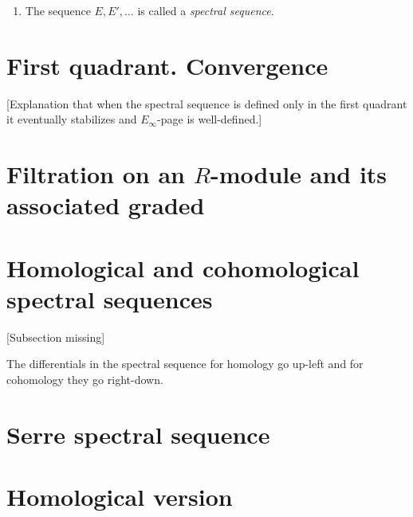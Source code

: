 \begin{enumerate}
	\item The sequence $E,E',\ldots$ is called a
	{\it spectral sequence}.
\end{enumerate}

\section{First quadrant. Convergence}
\label{section-first-quadrant-convergence}

[Explanation that when the spectral sequence
is defined only in the first quadrant it
eventually stabilizes and $E_{\infty}$-page
is well-defined.]

\section{Filtration on an
\texorpdfstring{$R$}{R}-module and its
associated graded}
\label{section-filtr-r-modul-its-assoc}

\section{Homological and cohomological
spectral sequences}
\label{section-homol-cohom-spect-seque}

[Subsection missing]

\begin{remark}
\label{remark-diffe-spect-seque-homol-go}
	The differentials in the spectral sequence
	for homology go up-left and for cohomology
	they go right-down.
\end{remark}

\section{Serre spectral sequence}
\label{section-serre-spectral-sequence}

\section{Homological version}
\label{section-homological-version}


